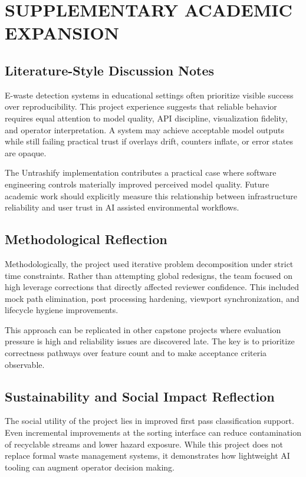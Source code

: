 \documentclass[12pt,a4paper]{report}
\begin{document}
\chapter{SUPPLEMENTARY ACADEMIC EXPANSION}
\section{Literature-Style Discussion Notes}
E-waste detection systems in educational settings often prioritize visible success over reproducibility. This project experience suggests that reliable behavior requires equal attention to model quality, API discipline, visualization fidelity, and operator interpretation. A system may achieve acceptable model outputs while still failing practical trust if overlays drift, counters inflate, or error states are opaque.

The Untrashify implementation contributes a practical case where software engineering controls materially improved perceived model quality. Future academic work should explicitly measure this relationship between infrastructure reliability and user trust in AI assisted environmental workflows.

\section{Methodological Reflection}
Methodologically, the project used iterative problem decomposition under strict time constraints. Rather than attempting global redesigns, the team focused on high leverage corrections that directly affected reviewer confidence. This included mock path elimination, post processing hardening, viewport synchronization, and lifecycle hygiene improvements.

This approach can be replicated in other capstone projects where evaluation pressure is high and reliability issues are discovered late. The key is to prioritize correctness pathways over feature count and to make acceptance criteria observable.

\section{Sustainability and Social Impact Reflection}
The social utility of the project lies in improved first pass classification support. Even incremental improvements at the sorting interface can reduce contamination of recyclable streams and lower hazard exposure. While this project does not replace formal waste management systems, it demonstrates how lightweight AI tooling can augment operator decision making.
\end{document}
